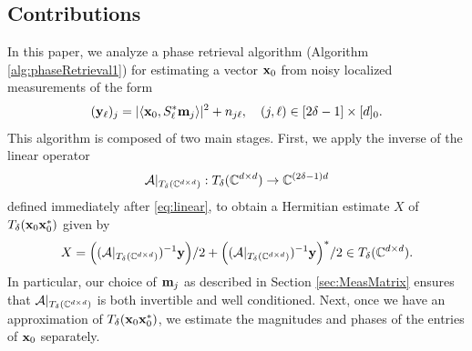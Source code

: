 


\subsection{Contributions}
\label{sec:mainRes}

In this paper, we analyze a phase retrieval algorithm (Algorithm \ref{alg:phaseRetrieval1}) for estimating a vector $\mathbf x_0$ from noisy localized measurements of the form
 \begin{equation} (\mathbf y_\ell)_j = |\langle \mathbf x_0, S^*_\ell \mathbf m_j \rangle|^2 + n_{j \ell}, \quad (j, \ell) \in [2\delta-1] \times [d]_0 \label{eq:shift_model_noise}.\end{equation}
 This algorithm is composed of two main stages. First, we apply the inverse of the linear operator
$$\mathcal{A}|_{T_{\delta}(\mathbb{C}^{d \times d})}: T_{\delta}(\mathbb{C}^{d\times d}) \to \mathbb{C}^{(2\delta-1)d}$$
  defined immediately after \eqref{eq:linear}, to obtain a Hermitian estimate ${X}$ of $T_\delta{(\mathbf x_0\mathbf x_0^*)}$ given by 
  \begin{equation}X = \Big( (\mathcal{A}|_{T_\delta(\mathbb{C}^{d\times d})})^{-1} {\bf y}\Big)/2 + \Big( (\mathcal{A}|_{T_\delta(\mathbb{C}^{d\times d})})^{-1} {\bf y}\Big)^*/2  \in T_\delta(\mathbb{C}^{d\times d}) \label{eq:X}
  .\end{equation} In particular, our choice of $\mathbf m_j$ as described in Section \ref{sec:MeasMatrix} ensures that $\mathcal{A}|_{T_{\delta}(\mathbb{C}^{d \times d})}$ is both invertible and well conditioned. Next, once we have an approximation of $T_\delta(\mathbf x_0 \mathbf x_0^*)$, we estimate the magnitudes and phases of the entries of $\mathbf x_0$ separately. 
  
